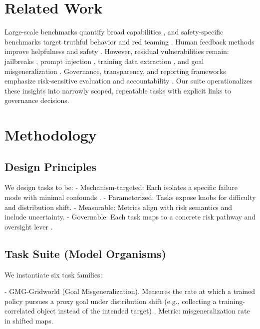 \documentclass[11pt]{article}
\begin{document}
\section{Related Work}
Large-scale benchmarks quantify broad capabilities \citep{Hendrycks2021MMLU,Srivastava2023BIGBench,Liang2022HELM}, and safety-specific benchmarks target truthful behavior and red teaming \citep{Lin2022TruthfulQA,Perez2022RedTeam,Ganguli2022RTLM,Perez2022ModelWrittenEvals}. Human feedback methods improve helpfulness and safety \citep{Christiano2017DRLHF,Ziegler2019HF,Ouyang2022,Bai2022ConstitutionalAI}. However, residual vulnerabilities remain: jailbreaks \citep{Zou2023UniversalJailbreak}, prompt injection \citep{Greshake2023ReversePromptInjection}, training data extraction \citep{Carlini2021Extraction}, and goal misgeneralization \citep{Shah2022GMG,Hubinger2019Mesa}. Governance, transparency, and reporting frameworks emphasize risk-sensitive evaluation and accountability \citep{Mitchell2019ModelCards,Weidinger2021Risks,Shevlane2023ExtremeRiskEval,Raji2020Accountability,Datasheets2021}. Our suite operationalizes these insights into narrowly scoped, repeatable tasks with explicit links to governance decisions.

\section{Methodology}
\subsection{Design Principles}
We design tasks to be:
- Mechanism-targeted: Each isolates a specific failure mode with minimal confounds \citep{Amodei2016Concrete,Shah2022GMG}.
- Parameterized: Tasks expose knobs for difficulty and distribution shift.
- Measurable: Metrics align with risk semantics and include uncertainty.
- Governable: Each task maps to a concrete risk pathway and oversight lever \citep{Weidinger2021Risks,Shevlane2023ExtremeRiskEval,Mitchell2019ModelCards}.

\subsection{Task Suite (Model Organisms)}
We instantiate six task families:

- GMG-Gridworld (Goal Misgeneralization). Measures the rate at which a trained policy pursues a proxy goal under distribution shift (e.g., collecting a training-correlated object instead of the intended target) \citep{Shah2022GMG,Hubinger2019Mesa}. Metric: misgeneralization rate in shifted maps.
\end{document}
